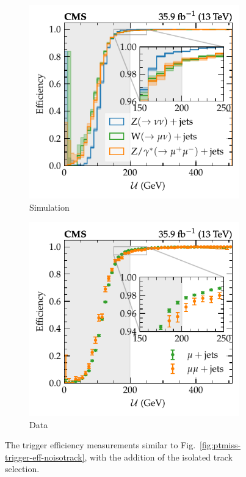 \begin{figure}[htb]
    \centering
    \begin{subfigure}[b]{0.49\textwidth}
        \centering
        \includegraphics{chapters/041_corrections/images/efficiencies/triggers/met/met_trig_eff_mc.pdf}
        \caption{Simulation}
        \label{subfiga:ptmiss-trigger-eff-isotrack}
    \end{subfigure}
    \hfill
    \begin{subfigure}[b]{0.49\textwidth}
        \centering
        \includegraphics{chapters/041_corrections/images/efficiencies/triggers/met/met_trig_eff_data.pdf}
        \caption{Data}
        \label{subfigb:ptmiss-trigger-eff-isotrack}
    \end{subfigure}
    \caption[Missing energy trigger efficiency measurements with the isolated track selection.]{
        The \ptmiss trigger efficiency measurements similar to Fig.~\ref{fig:ptmiss-trigger-eff-noisotrack}, with the addition of the isolated track selection.
    }
    \label{fig:ptmiss-trigger-eff-isotrack}
\end{figure}

